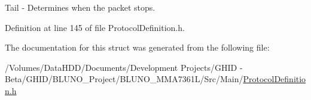 \-Tail -\/ \-Determines when the packet stops. 



\-Definition at line 145 of file \-Protocol\-Definition.\-h.



\-The documentation for this struct was generated from the following file\-:\begin{DoxyCompactItemize}
\item 
/\-Volumes/\-Data\-H\-D\-D/\-Documents/\-Development Projects/\-G\-H\-I\-D -\/ Beta/\-G\-H\-I\-D/\-B\-L\-U\-N\-O\-\_\-\-Project/\-B\-L\-U\-N\-O\-\_\-\-M\-M\-A7361\-L/\-Src/\-Main/\hyperlink{_protocol_definition_8h}{\-Protocol\-Definition.\-h}\end{DoxyCompactItemize}

